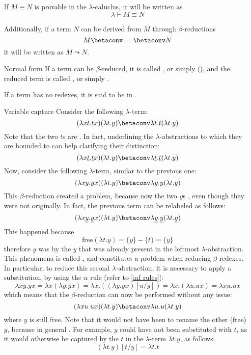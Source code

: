 \documentclass[a4paper, 12pt]{report}
\begin{document}
    If $M \equiv N$ is provable in the $\lambda$-caluclus, it will be written as $$\lambda \vdash M \equiv N$$

    Additionally, if a term $N$ can be derived from $M$ through $\beta$-reductions $$M \betaconv \ldots \betaconv N$$ it will be written as $M \leadsto N$.

    \begin{frameddefn}{Normal form}
         If a term can be $\beta$-reduced, it is called , or simply  (), and the reduced term is called , or simply .

         If a term has no redexes, it is said to be in .
    \end{frameddefn}

    \begin{framedobs}{Variable capture}
        Consider the following $\lambda$-term: $$(\lambda xt.tx)(\lambda t.y) \betaconv \lambda t.t(\lambda t.y)$$ Note that the two $t$s are . In fact, underlining the $\lambda$-abstractions to which they are bounded to can help clarifying their distinction: $$(\lambda x\underline{t}.\underline{t}x)(\lambda t.y) \betaconv \lambda \underline{t}.\underline{t}(\lambda t.y)$$ Now, consider the following $\lambda$-term, similar to the previous one: $$(\lambda xy.yx)(\lambda t.y) \betaconv \lambda y.y(\lambda t.y)$$ This $\beta$-reduction created a problem, because now the two $y$s , even though they were not originally. In fact, the previous term can be relabeled as follows: $$(\lambda x \underline y. \underline y x)(\lambda t.y) \betaconv \lambda \underline y. \underline y (\lambda t. \underline y)$$ This happened because $$\mathrm{free}(\lambda t.y) = \{y\} - \{t\} = \{y\}$$ therefore $y$ was  by the $y$ that was already present in the leftmost $\lambda$-abstraction. This phenomena is called , and constitutes a problem when reducing $\beta$-redexes. In particular, to reduce this second $\lambda$-abstraction, it is necessary to apply a substitution, by using the $\alpha$ rule (refer to \cref{inf rules}): $$\lambda xy.yx = \lambda x(\lambda y.yx) = \lambda x.((\lambda y.yx)[u/y]) = \lambda x.(\lambda u.ux) = \lambda x u. ux$$ which means that the $\beta$-reduction can now be performed without any issue: $$(\lambda xu.ux)(\lambda t.y) \betaconv \lambda u.u(\lambda t.y)$$ where $y$ is still free. Note that it would not have been  to rename the other (free) $y$, because in general . For example, $y$ could have not been substituted with $t$, as it would otherwise be captured by the $t$ in the $\lambda$-term $\lambda t.y$, as follows: $$(\lambda t.y)[t/y] =\lambda t.t$$
    \end{framedobs}
\end{document}
